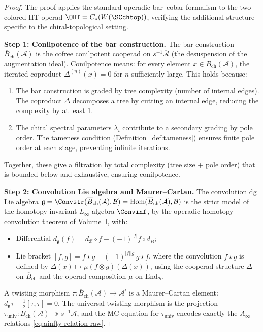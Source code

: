 \begin{proof}
The proof applies the standard operadic bar--cobar formalism \cite{BV73,MSS02} to the two-colored HT operad $\OHT = C_\ast(W(\SCchtop))$, verifying the additional structure specific to the chiral-topological setting.

\textbf{Step 1: Conilpotence of the bar construction.}
The bar construction $\overline{B}_{\mathrm{ch}}(\mathcal{A})$ is the cofree conilpotent cooperad on $s^{-1}\overline{\mathcal{A}}$ (the desuspension of the augmentation ideal). Conilpotence means: for every element $x \in \overline{B}_{\mathrm{ch}}(\mathcal{A})$, the iterated coproduct $\Delta^{(n)}(x) = 0$ for $n$ sufficiently large. This holds because:
\begin{enumerate}[label=(\alph*)]
\item The bar construction is graded by tree complexity (number of internal edges). The coproduct $\Delta$ decomposes a tree by cutting an internal edge, reducing the complexity by at least 1.
\item The chiral spectral parameters $\lambda_i$ contribute to a secondary grading by pole order. The tameness condition (Definition~\ref{def:tameness}) ensures finite pole order at each stage, preventing infinite iterations.
\end{enumerate}
Together, these give a filtration by total complexity (tree size + pole order) that is bounded below and exhaustive, ensuring conilpotence.

\textbf{Step 2: Convolution Lie algebra and Maurer--Cartan.}
The convolution dg Lie algebra
$\mathfrak{g} = \Convstr(\overline{B}_{\mathrm{ch}}(\mathcal{A}), \mathcal{B})
= \mathrm{Hom}(\overline{B}_{\mathrm{ch}}(\mathcal{A}), \mathcal{B})$
is the strict model of the homotopy-invariant $L_\infty$-algebra
$\Convinf$, by the operadic homotopy-convolution theorem of Volume~I,
with:
\begin{itemize}
\item Differential $d_{\mathfrak{g}}(f) = d_{\mathcal{B}} \circ f - (-1)^{|f|} f \circ d_{\overline{B}}$;
\item Lie bracket $[f,g] = f \star g - (-1)^{|f||g|} g \star f$, where the convolution $f \star g$ is defined by $\Delta(x) \mapsto \mu(f \otimes g)(\Delta(x))$, using the cooperad structure $\Delta$ on $\overline{B}_{\mathrm{ch}}$ and the operad composition $\mu$ on $\mathrm{End}_{\mathcal{B}}$.
\end{itemize}
A twisting morphism $\tau: \overline{B}_{\mathrm{ch}}(\mathcal{A}) \to \mathcal{A}^!$ is a Maurer--Cartan element: $d_{\mathfrak{g}}\tau + \frac{1}{2}[\tau,\tau] = 0$. The universal twisting morphism is the projection $\tau_{\mathrm{univ}}: \overline{B}_{\mathrm{ch}}(\mathcal{A}) \twoheadrightarrow s^{-1}\overline{\mathcal{A}}$, and the MC equation for $\tau_{\mathrm{univ}}$ encodes exactly the $A_\infty$ relations \eqref{eq:ainfty-relation-raw}.


\end{proof}
